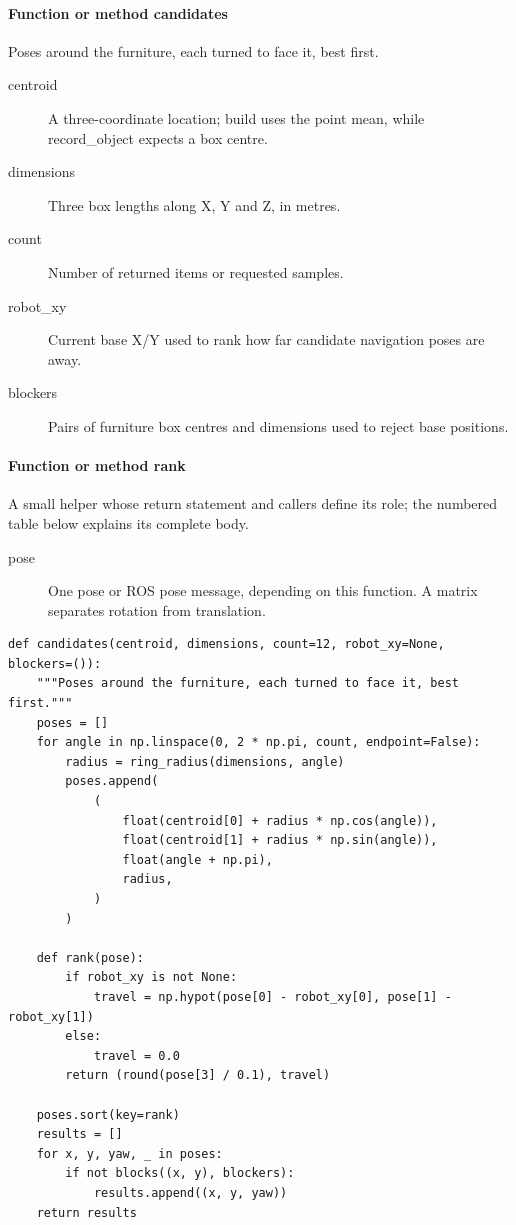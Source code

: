 \documentclass[11pt,a4paper]{book}
\begin{document}
\paragraph{Function or method candidates}
Poses around the furniture, each turned to face it, best first.

\begin{description}
\item[centroid] A three-coordinate location; build uses the point mean, while record\_object expects a box centre.
\item[dimensions] Three box lengths along X, Y and Z, in metres.
\item[count] Number of returned items or requested samples.
\item[robot\_xy] Current base X/Y used to rank how far candidate navigation poses are away.
\item[blockers] Pairs of furniture box centres and dimensions used to reject base positions.
\end{description}

\paragraph{Function or method rank}
A small helper whose return statement and callers define its role; the numbered table below explains its complete body.

\begin{description}
\item[pose] One pose or ROS pose message, depending on this function. A matrix separates rotation from translation.
\end{description}

\begin{lstlisting}[firstnumber=29]
def candidates(centroid, dimensions, count=12, robot_xy=None, blockers=()):
    """Poses around the furniture, each turned to face it, best first."""
    poses = []
    for angle in np.linspace(0, 2 * np.pi, count, endpoint=False):
        radius = ring_radius(dimensions, angle)
        poses.append(
            (
                float(centroid[0] + radius * np.cos(angle)),
                float(centroid[1] + radius * np.sin(angle)),
                float(angle + np.pi),
                radius,
            )
        )

    def rank(pose):
        if robot_xy is not None:
            travel = np.hypot(pose[0] - robot_xy[0], pose[1] - robot_xy[1])
        else:
            travel = 0.0
        return (round(pose[3] / 0.1), travel)

    poses.sort(key=rank)
    results = []
    for x, y, yaw, _ in poses:
        if not blocks((x, y), blockers):
            results.append((x, y, yaw))
    return results
\end{lstlisting}
\end{document}

